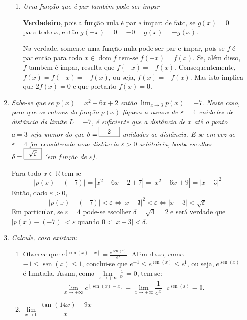 \documentclass[12pt,a4paper]{article}
\newcommand*\sen{\operatorname{sen}}
\newcommand*\abs[1]{\left|#1\right|}
\newcommand*\R{\mathbb{R}}
\begin{document}
\begin{enumerate}
\begin{enumerate}
\item  \textit{Uma função que é par também pode ser ímpar}

\textbf{Verdadeiro}, pois a função nula é par e ímpar: de fato, se $g(x) = 0$ para todo $x$, então $g(-x) = 0 = -0 = g(x) = -g(x)$.

Na verdade, somente uma função nula pode ser par e ímpar, pois se $f$ é par então para todo $x \in \operatorname{dom}{f}$ tem-se $f(-x) = f(x)$. Se, além disso, $f$ também é ímpar, resulta que $f(-x) = -f(x)$. Consequentemente, $f(x) = f(-x) = -f(x)$, ou seja, $f(x) = -f(x)$. Mas isto implica que $2 f(x) = 0$ e que portanto $f(x) = 0$.
\end{enumerate}


\item \textit{ Sabe-se que se $p(x) = x^2 - 6x + 2$ então $\lim_{x \to 3} p(x) = -7$. Neste caso, para que os valores da função $p(x)$ fiquem a menos de $\varepsilon = 4$ unidades de distância do limite $L = -7$, é suficiente que a distância de $x$ até o ponto $a = 3$ seja menor do que $\delta = \framebox(30,15){2}$ unidades de distância. E se em vez de $\varepsilon = 4$ for considerada uma distância $\varepsilon > 0$ arbitrária, basta escolher $\delta = \framebox(26,15){ $\sqrt{\varepsilon}$ }$ (em função de $\varepsilon$). }

Para todo $x \in \R$ tem-se
\[
\abs{p(x) - (-7)}
= \abs{x^2-6x+2 +7}
= \abs{x^2-6x+9}
= \abs{x-3}^2
\]
Então, dado $\varepsilon > 0$,
\[
\abs{p(x) - (-7)} < \varepsilon
\Leftrightarrow
\abs{x-3}^2 < \varepsilon
\Leftrightarrow
\abs{x-3} < \sqrt{ \varepsilon }
\]
Em particular, se $\varepsilon = 4$ pode-se escolher $\delta = \sqrt{4} = 2$ e será verdade que $\abs{p(x) - (-7)} < \varepsilon$ quando $0 < \abs{x-3} < \delta$.

\item \textit{Calcule, caso existam:}
\begin{enumerate}

\item Observe que $e^{[\sen(x)-x]} = \frac{ e^{\sen(x)} }{e^x}$. Além disso, como $-1 \leq \sen(x) \leq 1$, conclui-se que $e^{-1} \leq e^{\sen(x)} \leq e^1$, ou seja, $e^{\sen(x)}$ é limitada. Assim, como $\lim\limits_{x\to +\infty} \frac{ 1 }{e^x} = 0$, tem-se:
\[
\lim\limits_{x\to +\infty} e^{[\sen(x)-x]}
= \lim\limits_{x\to +\infty} \frac{ 1 }{e^x} \cdot e^{\sen(x)}
= 0.
\]

\item $\lim\limits_{x\to 0} \dfrac{\tan(14x) - 9x}{x}$


\end{enumerate}
\end{enumerate}
\end{document}
